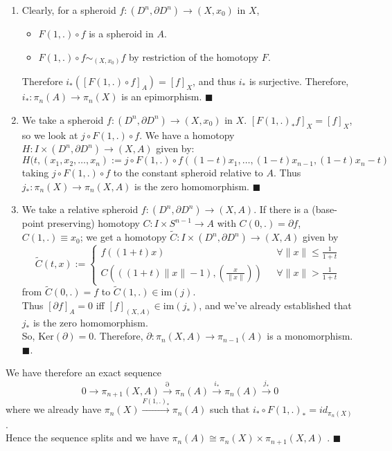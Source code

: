 \documentclass[11pt]{article}
\numberwithin{equation}{section}
\begin{document}
\begin{enumerate}
	\item Clearly, for a spheroid $f:(D^n,\partial D^n)\rightarrow (X,x_0)$ in $X$, 
	\begin{itemize}
	\item $F(1,.)\circ f$ is a spheroid in $A$. 
	\item $F(1,.)\circ f\sim_{(X,x_0)}f$ by restriction of the homotopy $F$.
	\end{itemize}
	Therefore $i_*([F(1,.)\circ f]_A)=[f]_X$, and thus $i_*$ is surjective. Therefore, $i_{*}:\pi_n(A)\rightarrow \pi_n(X)$ is an epimorphism. $\blacksquare$
	\item We take a spheroid $f:(D^n,\partial D^n)\rightarrow (X,x_0)$ in $X$. $[F(1,.)_*f]_X= [f]_X$, so we look at $j\circ F(1,.)\circ f$. We have a homotopy $H:I\times (D^n,\partial D^n)\rightarrow (X,A)$ given by: 
	$$ H(t,(x_1,x_2,\dots, x_n):= j\circ F(1,.)\circ f((1-t)x_1,\dots,(1-t)x_{n-1},(1-t)x_n-t)$$ taking $j\circ F(1,.)\circ f$ to the constant spheroid relative to $A$. Thus $j_{*}:\pi_n(X)\rightarrow\pi_n(X,A)$ is the zero homomorphism. $\blacksquare$
	\item We take a relative spheroid $f:(D^n,\partial D^n)\rightarrow (X,A)$. If there is a (base-point preserving) homotopy $C:I\times S^{n-1}\rightarrow A$ with $C(0,.)=\partial f$, $C(1,.)\equiv x_0$; we get a homotopy $\tilde{C}:I\times(D^n,\partial D^n)\rightarrow (X,A)$ given by 
	$$\tilde{C}(t,x):=
	\begin{cases}
	f((1+t)x)&\ \ \ \forall\lVert x\rVert \leqslant \frac{1}{1+t} \\ 
	C\left(((1+t)\lVert x\rVert -1),\left(\frac{x}{\lVert x\rVert}\right)\right) &\ \ \ \forall\lVert x\rVert > \frac{1}{1+t}
	\end{cases}$$ from $\tilde{C}(0,.)=f$ to $\tilde{C}(1,.)\in\text{im}(j)$. \\ 
	Thus $[\partial f]_A= 0$ iff $[f]_(X,A)\in \text{im}(j_*)$, and we've already established that $j_*$ is the zero homomorphism. \\ 
	So, $\text{Ker}(\partial) =0$. Therefore, $\partial: \pi_n(X,A)\rightarrow \pi_{n-1}(A)$ is a monomorphism. $\blacksquare$. 
\end{enumerate}
We have therefore an exact sequence 
$$0\rightarrow\pi_{n+1}(X,A)\xrightarrow{\partial}\pi_n(A)\xrightarrow{i_*}\pi_{n}(A)\xrightarrow{j_*}0 $$
where we already have $\pi_{n}(X)\xrightarrow{F(1,.)_*}\pi_n(A)$ such that $i_*\circ F(1,.)_*= id_{\pi_{n}(X)}$. \\ Hence the sequence splits and we have $\pi_n(A)\cong \pi_n(X)\times\pi_{n+1}(X,A)$ .  $\blacksquare$
\end{document}
